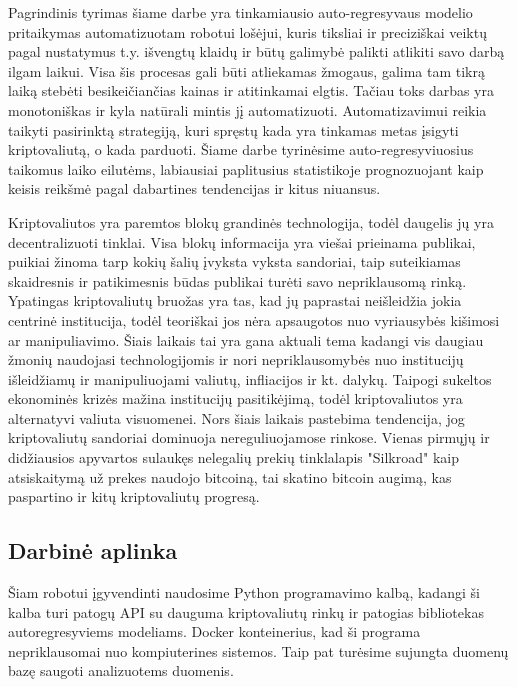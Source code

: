\documentclass{VUMIFInfKursinis}
\begin{document}

Pagrindinis tyrimas šiame darbe yra tinkamiausio auto-regresyvaus modelio pritaikymas automatizuotam robotui lošėjui, kuris tiksliai ir preciziškai veiktų pagal nustatymus
t.y. išvengtų klaidų ir būtų galimybė palikti atlikiti savo darbą ilgam laikui. Visa šis procesas gali būti atliekamas žmogaus, galima tam tikrą laiką stebėti besikeičiančias
kainas ir atitinkamai elgtis. Tačiau toks darbas yra monotoniškas ir kyla natūrali mintis jį automatizuoti. Automatizavimui reikia taikyti pasirinktą strategiją, kuri spręstų
kada yra tinkamas metas įsigyti kriptovaliutą, o kada parduoti. Šiame darbe tyrinėsime auto-regresyviuosius taikomus laiko eilutėms, labiausiai paplitusius statistikoje
prognozuojant kaip keisis reikšmė pagal dabartines tendencijas ir kitus niuansus.

Kriptovaliutos yra paremtos blokų grandinės technologija, todėl daugelis jų yra decentralizuoti tinklai. Visa blokų informacija yra viešai prieinama publikai, puikiai žinoma
tarp kokių šalių įvyksta vyksta sandoriai, taip suteikiamas skaidresnis ir patikimesnis būdas publikai turėti savo nepriklausomą rinką. Ypatingas kriptovaliutų bruožas yra tas,
kad jų paprastai neišleidžia jokia centrinė institucija, todėl teoriškai jos nėra apsaugotos nuo vyriausybės kišimosi ar manipuliavimo. Šiais laikais tai yra gana aktuali tema
kadangi vis daugiau žmonių naudojasi technologijomis ir nori nepriklausomybės nuo institucijų išleidžiamų ir manipuliuojami valiutų, infliacijos ir kt. dalykų. Taipogi sukeltos
ekonominės krizės mažina institucijų pasitikėjimą, todėl kriptovaliutos yra alternatyvi valiuta visuomenei. Nors šiais laikais pastebima tendencija, jog kriptovaliutų sandoriai
dominuoja nereguliuojamose rinkose. Vienas pirmųjų ir didžiausios apyvartos sulaukęs nelegalių prekių tinklalapis "Silkroad" kaip atsiskaitymą už prekes naudojo bitcoiną, tai
skatino bitcoin augimą, kas paspartino ir kitų kriptovaliutų progresą.

\subsection{Darbinė aplinka}
Šiam robotui įgyvendinti naudosime Python programavimo kalbą, kadangi ši kalba turi patogų API su dauguma kriptovaliutų rinkų ir patogias bibliotekas autoregresyviems modeliams.
Docker konteinerius, kad ši programa nepriklausomai nuo kompiuterines sistemos. Taip pat turėsime sujungta duomenų
bazę saugoti analizuotems duomenis. 
\end{document}
